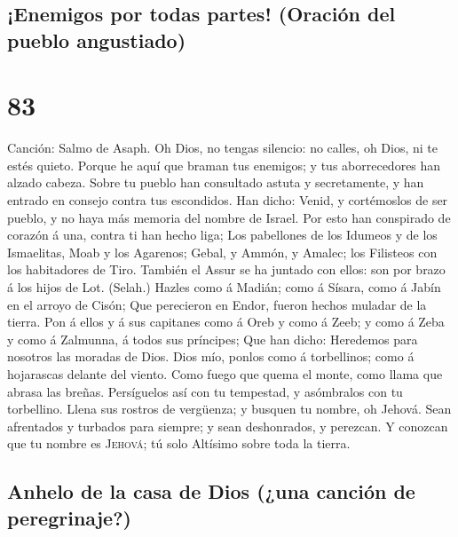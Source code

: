 \hypertarget{enemigos-por-todas-partes-oraciuxf3n-del-pueblo-angustiado}{%
\subsection{¡Enemigos por todas partes! (Oración del pueblo
angustiado)}\label{enemigos-por-todas-partes-oraciuxf3n-del-pueblo-angustiado}}

\hypertarget{section-82}{%
\section{83}\label{section-82}}

 Canción: Salmo de Asaph. Oh Dios, no tengas silencio: no
calles, oh Dios, ni te estés quieto.  Porque he aquí que
braman tus enemigos; y tus aborrecedores han alzado cabeza.
 Sobre tu pueblo han consultado astuta y secretamente, y
han entrado en consejo contra tus escondidos.  Han dicho:
Venid, y cortémoslos de ser pueblo, y no haya más memoria del nombre de
Israel.  Por esto han conspirado de corazón á una, contra
ti han hecho liga;  Los pabellones de los Idumeos y de los
Ismaelitas, Moab y los Agarenos;  Gebal, y Ammón, y
Amalec; los Filisteos con los habitadores de Tiro. 
También el Assur se ha juntado con ellos: son por brazo á los hijos de
Lot. (Selah.)  Hazles como á Madián; como á Sísara, como á
Jabín en el arroyo de Cisón;  Que perecieron en Endor,
fueron hechos muladar de la tierra.  Pon á ellos y á sus
capitanes como á Oreb y como á Zeeb; y como á Zeba y como á Zalmunna, á
todos sus príncipes;  Que han dicho: Heredemos para
nosotros las moradas de Dios.  Dios mío, ponlos como á
torbellinos; como á hojarascas delante del viento.  Como
fuego que quema el monte, como llama que abrasa las breñas.
 Persíguelos así con tu tempestad, y asómbralos con tu
torbellino.  Llena sus rostros de vergüenza; y busquen tu
nombre, oh Jehová.  Sean afrentados y turbados para
siempre; y sean deshonrados, y perezcan.  Y conozcan que
tu nombre es \textsc{Jehová}; tú solo Altísimo sobre toda la tierra.

\hypertarget{anhelo-de-la-casa-de-dios-una-canciuxf3n-de-peregrinaje}{%
\subsection{Anhelo de la casa de Dios (¿una canción de
peregrinaje?)}\label{anhelo-de-la-casa-de-dios-una-canciuxf3n-de-peregrinaje}}

